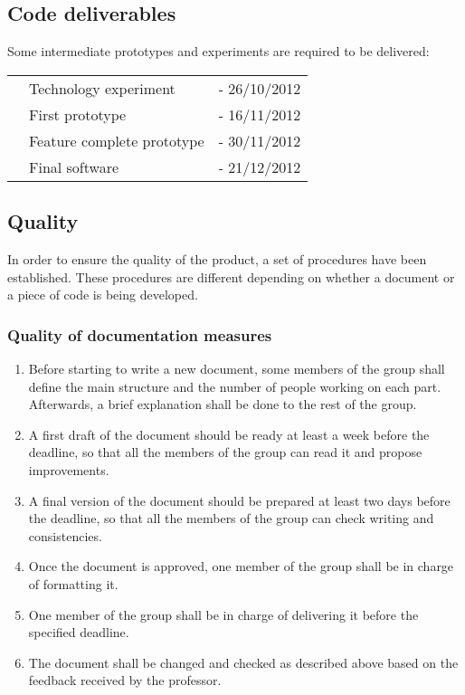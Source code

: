 \subsection{Code deliverables}

Some intermediate prototypes and experiments are required to be delivered:

\begin{listliketab} 
  \begin{tabular}{Lll}
  	\textbullet & Technology experiment 	 & - 26/10/2012 \\
  	\textbullet & First prototype 		     & - 16/11/2012 \\
  	\textbullet & Feature complete prototype & - 30/11/2012 \\
  	\textbullet & Final software 			 & - 21/12/2012
  \end{tabular} 
\end{listliketab}

\subsection{Quality}

In order to ensure the quality of the product, a set of procedures have been
established. These procedures are different depending on whether a document or a piece of code is being developed.

\subsubsection{Quality of documentation measures}

\begin{enumerate}
  \item Before starting to write a new document, some members of the group shall define the main structure and the 
  number of people working on each part. Afterwards, a brief explanation shall be done to the rest of the group.
  \item A first draft of the document should be ready at least a week before the deadline, so that all the members 
  of the group can read it and propose improvements.
  \item A final version of the document should be prepared at least two days before the deadline, so that all the 
  members of the group can check writing and consistencies.
  \item Once the document is approved, one member of the group shall be in charge of formatting it.
  \item One member of the group shall be in charge of delivering it before the specified deadline.
  \item The document shall be changed and checked as described above based on the feedback received by the professor.
\end{enumerate}


